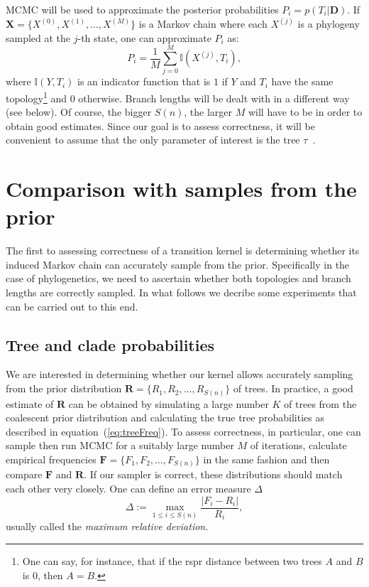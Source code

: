MCMC will be used to approximate the posterior probabilities $P_i = p(T_i | \boldsymbol D)$.
If $\boldsymbol X = \{X^{(0)}, X^{(1)}, \ldots, X^{(M)}\}$ is a Markov chain where each $X^{(j)}$ is a phylogeny sampled at the $j$-th state, one can approximate $P_i$ as:
\begin{equation}
 \label{eq:treeFreq}
 P_i =  \frac{1}{M}\sum_{j=0} ^M \mathbb{I}(X^{(j)}, T_i),
\end{equation}
where $\mathbb{I}(Y, T_i)$ is an indicator function that is $1$ if $Y$ and $T_i$ have the same topology\footnote{One can say, for instance, that if the rspr distance between two trees $A$ and $B$ is $0$, then $A = B$.} and $0$ otherwise.
Branch lengths will be dealt with in a different way (see below).
Of course, the bigger $S(n)$, the larger $M$ will have to be in order to obtain good estimates.
Since our goal is to assess correctness, it will be convenient to assume that the only parameter of interest is the tree $\tau$~\citep{Lakner2008}.

\section*{Comparison with samples from the prior}

The first to assessing correctness of a transition kernel is determining whether its induced Markov chain can accurately sample from the prior.
Specifically in the case of phylogenetics, we need to ascertain whether both topologies and branch lengths are correctly sampled.
In what follows we decribe some experiments that can be carried out to this end.

\subsection*{Tree and clade probabilities}

We are interested in determining whether our kernel allows accurately sampling from the prior distribution $\boldsymbol R = \{R_1, R_2, \ldots, R_{S(n)} \}$ of trees.
In practice, a good estimate of $\boldsymbol R$ can be obtained by simulating a large number $K$ of trees from the coalescent prior distribution and  calculating the true tree probabilities as described in equation~(\ref{eq:treeFreq}).
To assess correctness, in particular, one can sample then run MCMC for a suitably large number $M$ of iterations, calculate empirical frequencies $\boldsymbol F = \{F_1, F_2, \ldots, F_{S(n)} \}$ in the same fashion and then compare $\boldsymbol F$ and $\boldsymbol R$.
If our sampler is correct, these distributions should match each other very closely.
One can define an error measure $\Delta$
\[ \Delta := \max_{1 \leq i \leq S(n)} \frac{|F_i - R_i|}{R_i}, \]
usually called the \textit{maximum relative deviation}.  

